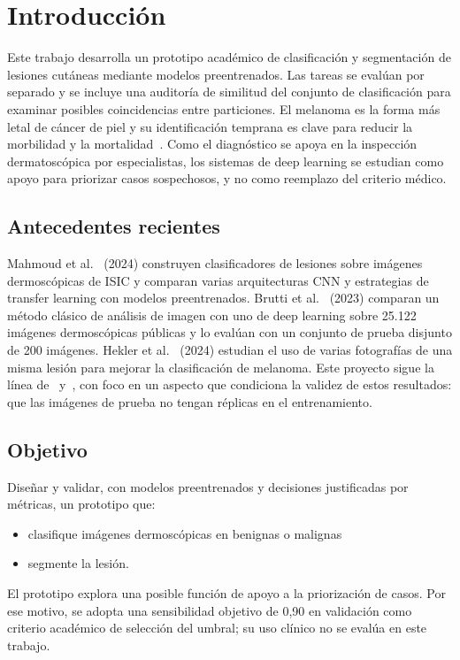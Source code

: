 \documentclass[conference]{IEEEtran}
\begin{document}
	\section{Introducción}
	
	Este trabajo desarrolla un prototipo académico de clasificación y segmentación de lesiones cutáneas mediante modelos preentrenados. Las tareas se evalúan por separado y se incluye una auditoría de similitud del conjunto de clasificación para examinar posibles coincidencias entre particiones. El melanoma es la forma más letal de cáncer de piel y su identificación temprana es clave para reducir la morbilidad y la mortalidad~\cite{mahmoud2024}. Como el diagnóstico se apoya en la inspección dermatoscópica por especialistas, los sistemas de deep learning se estudian como apoyo para priorizar casos sospechosos, y no como reemplazo del criterio médico.
	
	\subsection{Antecedentes recientes}
	
	Mahmoud et al.~\cite{mahmoud2024} (2024) construyen clasificadores de lesiones sobre imágenes dermoscópicas de ISIC y comparan varias arquitecturas CNN y estrategias de transfer learning con modelos preentrenados. Brutti et al.~\cite{brutti2023} (2023) comparan un método clásico de análisis de imagen con uno de deep learning sobre 25.122 imágenes dermoscópicas públicas y lo evalúan con un conjunto de prueba disjunto de 200 imágenes. Hekler et al.~\cite{hekler2024} (2024) estudian el uso de varias fotografías de una misma lesión para mejorar la clasificación de melanoma. Este proyecto sigue la línea de~\cite{mahmoud2024} y~\cite{brutti2023}, con foco en un aspecto que condiciona la validez de estos resultados: que las imágenes de prueba no tengan réplicas en el entrenamiento.
	
	\subsection{Objetivo}
	
	Diseñar y validar, con modelos preentrenados y decisiones justificadas por métricas, un prototipo que:
	\begin{itemize}
		\item clasifique imágenes dermoscópicas en benignas o malignas
		\item segmente la lesión.
	\end{itemize}
	El prototipo explora una posible función de apoyo a la priorización de casos. Por ese motivo, se adopta una sensibilidad objetivo de 0,90 en validación como criterio académico de selección del umbral; su uso clínico no se evalúa en este trabajo.
	
\end{document}

